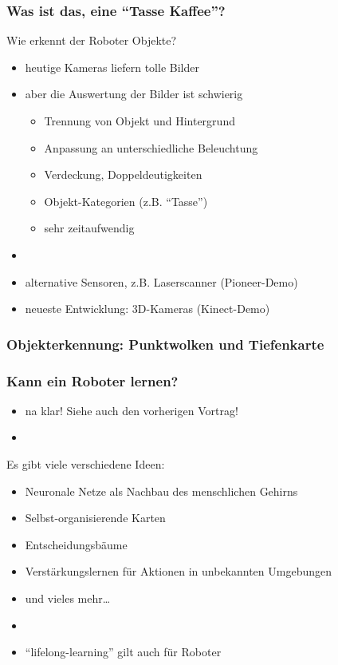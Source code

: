 \documentclass[t]{beamer}
\def\ii{\item[]}
\begin{document}
\begin{frame}
\frametitle{Was ist das, eine "`Tasse Kaffee"'?}
Wie erkennt der Roboter Objekte?
\begin{itemize}
\item heutige Kameras liefern tolle Bilder
\item aber die Auswertung der Bilder ist schwierig
\begin{itemize}
 \item Trennung von Objekt und Hintergrund
 \item Anpassung an unterschiedliche Beleuchtung
 \item Verdeckung, Doppeldeutigkeiten
 \item Objekt-Kategorien (z.B. "`Tasse"')
 \item sehr zeitaufwendig 
\end{itemize}
\ii
\item alternative Sensoren, z.B. Laserscanner  \hfill (Pioneer-Demo) 
\item neueste Entwicklung: 3D-Kameras \hfill (Kinect-Demo)
\end{itemize}
\end{frame}


\begin{frame}
\frametitle{Objekterkennung: Punktwolken und Tiefenkarte}
%
%
\end{frame}


\begin{frame}
\frametitle{Kann ein Roboter lernen?}
\begin{itemize}
\item na klar!  Siehe auch den vorherigen Vortrag!
\ii
\end{itemize}
Es gibt viele verschiedene Ideen:
\begin{itemize}
\item Neuronale Netze als Nachbau des menschlichen Gehirns 
\item Selbst-organisierende Karten
\item Entscheidungsbäume
\item Verstärkungslernen für Aktionen in unbekannten Umgebungen
\item und vieles mehr\dots
\ii
\item "`lifelong-learning"' gilt auch für Roboter
\end{itemize}
\end{frame}
\end{document}
